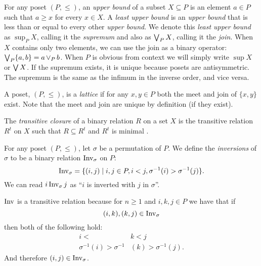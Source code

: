 	\begin{definition}
		For any poset $(P, \le)$, an \emph{upper bound} of a subset $X \subseteq P$ is an element $a \in P$ such that $a \ge x$ for every $x \in X$. A \emph{least upper bound} is an \emph{upper bound} that is less than or equal to every other \emph{upper bound}. We denote this \emph{least upper bound} as $\sup_P X$, calling it the \emph{supremum} \cite{birkhoﬀ1967lattice} and also as $\operatorname{\bigvee}_P X$, calling it the \emph{join}. When $X$ contains only two elements, we can use the join as a binary operator: $\operatorname{\bigvee}_P \{a, b\} = a \operatorname{\vee}_P b$. When $P$ is obvious from context we will simply write $\sup X$ or $\operatorname{\bigvee} X$. If the supremum exists, it is unique because posets are antisymmetric. The supremum is the same as the infimum in the inverse order, and vice versa.
	\end{definition}

	\begin{definition}
		\label{lattice-definition}
		A poset, $(P, \le)$, is a \emph{lattice} if for any $x, y \in P$ both the meet and join of $\{x, y\}$ exist. Note that the meet and join are unique by definition (if they exist).
	\end{definition}

	\begin{definition}
		\label{transitive-closure-definition}
		The \emph{transitive closure} of a binary relation $R$ on a set $X$ is the transitive relation $R^t$ on $X$ such that $R \subseteq R^t$ and $R^t$ is minimal \cite[p. 337]{lidl1998applied}.
	\end{definition}

	\begin{definition}
		\label{inversion-definition}
		For any poset $(P, \le)$, let $\sigma$ be a permutation of $P$. We define the \emph{inversions} of $\sigma$ to be a binary relation $\operatorname{Inv}_{\sigma}$ on $P$:
		\[
			\operatorname{Inv}_{\sigma} = \{(i,j) \mid i, j \in P, i < j, \sigma^{-1}(i) > \sigma^{-1}(j)\}.
		\]
		We can read $i \operatorname{Inv}_{\sigma} j$ as ``$i$ is inverted with $j$ in $\sigma$''.

		$\operatorname{Inv}$ is a transitive relation because for $n \ge 1$ and $i, k, j \in P$ we have that if
		\[
			(i, k), (k, j) \in \operatorname{Inv}_{\sigma}
		\]
		then both of the following hold:
		\begin{align*}
			i < &k < j \\
			\sigma^{-1}(i) > \sigma^{-1}&(k) > \sigma^{-1}(j).
		\end{align*}
		And therefore $(i, j) \in \operatorname{Inv}_{\sigma}$.
	\end{definition}

